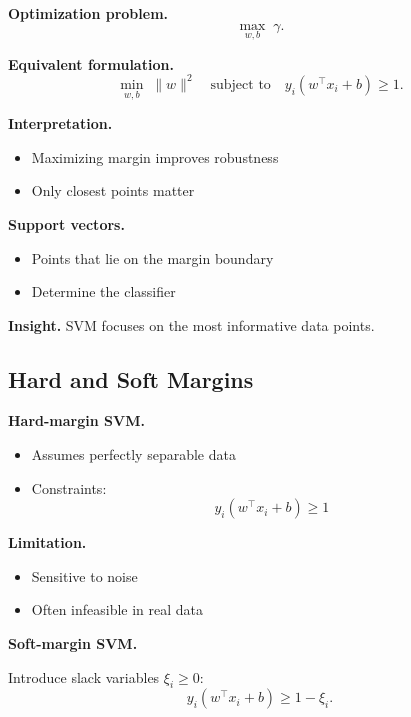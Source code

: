 \medskip

\noindent
\textbf{Optimization problem.}
\[
\max_{w,b} \; \gamma.
\]

\medskip

\noindent
\textbf{Equivalent formulation.}
\[
\min_{w,b} \; \|w\|^2 \quad \text{subject to} \quad y_i(w^\top x_i + b) \geq 1.
\]

\medskip

\noindent
\textbf{Interpretation.}
\begin{itemize}
    \item Maximizing margin improves robustness
    \item Only closest points matter
\end{itemize}

\medskip

\noindent
\textbf{Support vectors.}
\begin{itemize}
    \item Points that lie on the margin boundary
    \item Determine the classifier
\end{itemize}

\medskip

\noindent
\textbf{Insight.}  
SVM focuses on the most informative data points.

\subsection{Hard and Soft Margins}

\textbf{Hard-margin SVM.}
\begin{itemize}
    \item Assumes perfectly separable data
    \item Constraints:
    \[
    y_i(w^\top x_i + b) \geq 1
    \]
\end{itemize}

\medskip

\noindent
\textbf{Limitation.}
\begin{itemize}
    \item Sensitive to noise
    \item Often infeasible in real data
\end{itemize}

\medskip

\noindent
\textbf{Soft-margin SVM.}

Introduce slack variables $\xi_i \geq 0$:
\[
y_i(w^\top x_i + b) \geq 1 - \xi_i.
\]

\medskip

